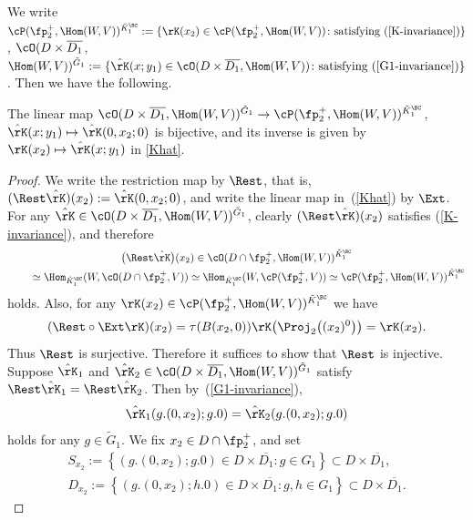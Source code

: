 We write $\cP(\fp^+_2,\Hom(W,V))^{\tilde{K}^\BC_1}:=\{\rK(x_2)\in \cP(\fp^+_2,\Hom(W,V))\colon \text{satisfying }(\ref{K-invariance})\}$,
$\cO(D\times \overline{D_1}$, $\Hom(W,V))^{\tilde{G}_1}
:=\{\hat{\rK}(x;y_1)\in\cO(D\times \overline{D_1}, \Hom(W,V))\colon \text{satisfying }(\ref{G1-invariance})\}$.
Then we have the following.
\begin{Lemma}
The linear map $\cO(D\times \overline{D_1}, \Hom(W,V))^{\tilde{G}_1}\to\cP(\fp^+_2,\Hom(W,V))^{\tilde{K}^\BC_1}$,
$\hat{\rK}(x;y_1)\mapsto \hat{\rK}(0,x_2;0)$ is bijective, and its inverse is given by $\rK(x_2)\mapsto \hat{\rK}(x;y_1)$ in \eqref{Khat}.
\end{Lemma}
\begin{proof}We write the restriction map by $\Rest$, that is, $(\Rest \hat{\rK})(x_2):=\hat{\rK}(0,x_2;0)$,
and write the linear map in~(\ref{Khat}) by $\Ext$.
For any $\hat{\rK}\in\cO(D\times \overline{D_1}, \Hom(W,V))^{\tilde{G}_1}$, clearly $(\Rest \hat{\rK})(x_2)$ satisfies
(\ref{K-invariance}), and therefore
\begin{gather*}
\big(\Rest \hat{\rK}\big)(x_2)\in \cO(D\cap \fp^+_2,\Hom(W,V))^{\tilde{K}^\BC_1}\\
\qquad {} \simeq \Hom_{\tilde{K}^\BC_1}(W,\cO(D\cap\fp^+_2,V)) \simeq\Hom_{\tilde{K}^\BC_1}(W,\cP(\fp^+_2,V))\simeq\cP(\fp^+_2,\Hom(W,V))^{\tilde{K}^\BC_1}
\end{gather*}
holds.
Also, for any $\rK(x_2)\in\cP(\fp^+_2,\allowbreak\Hom(W,V))^{\tilde{K}^\BC_1}$ we have
\begin{gather*} (\Rest\circ\Ext \rK)(x_2)=\tau(B(x_2,0))\rK\big(\Proj_2\big((x_2)^0\big)\big)=\rK(x_2). \end{gather*}
Thus $\Rest$ is surjective. Therefore it suffices to show that $\Rest$ is injective.
Suppose $\hat{\rK}_1$ and $\hat{\rK}_2\in\cO(D\times \overline{D_1}, \Hom(W,V))^{\tilde{G}_1}$ satisfy $\Rest\hat{\rK}_1=\Rest\hat{\rK}_2$.
Then by~(\ref{G1-invariance}),
\begin{gather*} \hat{\rK}_1(g.(0,x_2);g.0)=\hat{\rK}_2(g.(0,x_2);g.0) \end{gather*}
holds for any $g\in\tilde{G}_1$.
We fix $x_2\in D\cap \fp^+_2$, and set
\begin{gather*}
S_{x_2} :=\left\{ (g.(0,x_2);g.0)\in D\times\overline{D_1}\colon g\in G_1\right\}\subset D\times\overline{D_1}, \\
D_{x_2} :=\left\{ (g.(0,x_2);h.0)\in D\times\overline{D_1}\colon g,h\in G_1\right\}\subset D\times\overline{D_1}.
\end{gather*}

\end{proof}
